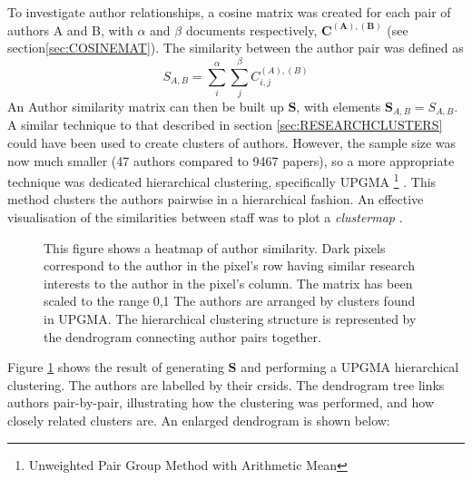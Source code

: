 To investigate author relationships, a cosine matrix was created for each pair of authors A and B, with $\alpha$ and $\beta$ documents respectively, $\mathbf{C^{\left( A \right ) , \left( B \right)}}$ (see section\ref{sec:COSINEMAT}). The similarity between the author pair was defined as 
$$S_{A , B} = \sum_{i}^{\alpha} \sum_{j}^{\beta} C^{\left( A \right) , \left( B \right) }_{ i , j }$$
An Author similarity matrix can then be built up $\mathbf{S}$, with elements $\mathbf{S}_{ A , B }=S_{ A , B }$.
A similar technique to that described in section \ref{sec:RESEARCHCLUSTERS} could have been used to create clusters of authors. However, the sample size was now much smaller (47 authors compared to 9467 papers), so a more appropriate technique was dedicated hierarchical clustering, specifically UPGMA \footnote{Unweighted Pair Group Method with Arithmetic Mean} \cite{heatmapcluster}. This method clusters the authors pairwise in a hierarchical fashion.  An effective visualisation of the similarities between staff was to plot a \emph{clustermap} \cite{seaborn} \cite{scipy}.
\begin{center}
\begin{figure}[H]
\label{fig:AUTHORSIMS}
  \centering
    \caption{This figure shows a heatmap of author similarity. Dark pixels correspond to the author in the pixel's row having similar research interests to the author in the pixel's column. The matrix has been scaled to the range 0,1  The authors are arranged by clusters found in UPGMA. The hierarchical clustering structure is represented by the dendrogram connecting author pairs together.}
\end{figure} 
\end{center}
Figure \ref{fig:AUTHORSIMS} shows the result of generating $\textbf{S}$ and performing a UPGMA hierarchical clustering. The authors are labelled by their crsids. The dendrogram tree links authors pair-by-pair, illustrating how the clustering was performed, and how closely related clusters are. An enlarged dendrogram is shown below:
